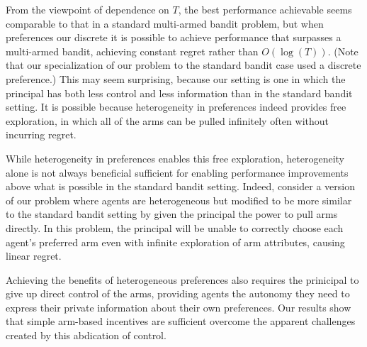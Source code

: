From the viewpoint of dependence on $T$, the best performance achievable seems comparable to that in a standard multi-armed bandit problem, but when preferences our discrete  it is possible to achieve performance that surpasses a multi-armed bandit, achieving constant regret rather than $O(\log(T))$.
(Note that our specialization of our problem to the standard bandit case used a discrete preference.)
This may seem surprising, because our setting is one in which the principal has both less control and less information than in the standard bandit setting.
It is possible because heterogeneity in preferences indeed provides free exploration, in which all of the arms can be pulled infinitely often without incurring regret.

While heterogeneity in preferences enables this free exploration, heterogeneity alone is not always beneficial sufficient for enabling performance improvements above what is possible in the standard bandit setting.  Indeed, consider a version of our problem where agents are heterogeneous but modified to be more similar to the standard bandit setting by given the principal the power to pull arms directly.  In this problem, the principal will be unable to correctly choose each agent's preferred arm even with infinite exploration of arm attributes, causing linear regret.

Achieving the benefits of heterogeneous preferences also requires the prinicipal to give up direct control of the arms, providing agents the autonomy they need to express their private information about their own preferences.  Our results show that simple arm-based incentives are sufficient overcome the apparent challenges created by this abdication of control.

